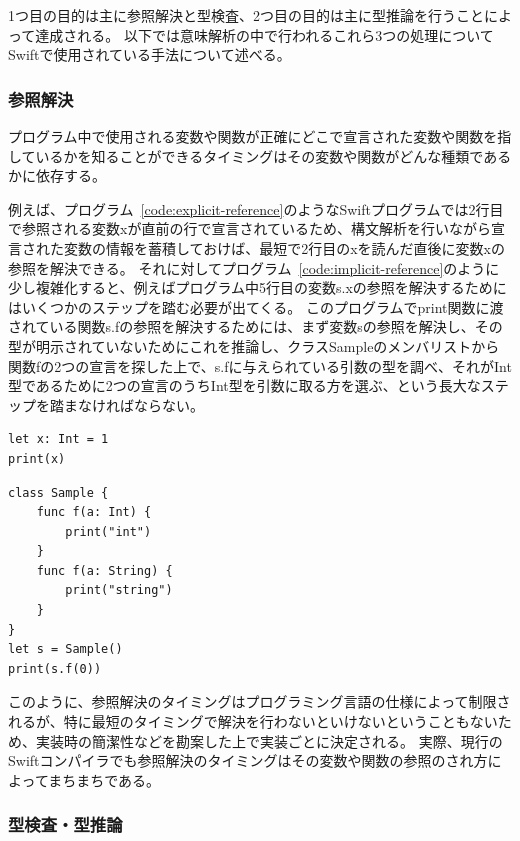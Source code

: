 1つ目の目的は主に参照解決と型検査、2つ目の目的は主に型推論を行うことによって達成される。
以下では意味解析の中で行われるこれら3つの処理についてSwiftで使用されている手法について述べる。

\subsubsection{参照解決}

プログラム中で使用される変数や関数が正確にどこで宣言された変数や関数を指しているかを知ることができるタイミングはその変数や関数がどんな種類であるかに依存する。

例えば、プログラム~\ref{code:explicit-reference}のようなSwiftプログラムでは2行目で参照される変数xが直前の行で宣言されているため、構文解析を行いながら宣言された変数の情報を蓄積しておけば、最短で2行目のxを読んだ直後に変数xの参照を解決できる。
それに対してプログラム~\ref{code:implicit-reference}のように少し複雑化すると、例えばプログラム中5行目の変数s.xの参照を解決するためにはいくつかのステップを踏む必要が出てくる。
このプログラムでprint関数に渡されている関数s.fの参照を解決するためには、まず変数sの参照を解決し、その型が明示されていないためにこれを推論し、クラスSampleのメンバリストから関数fの2つの宣言を探した上で、s.fに与えられている引数の型を調べ、それがInt型であるために2つの宣言のうちInt型を引数に取る方を選ぶ、という長大なステップを踏まなければならない。

\begin{lstlisting}[caption=直ちに変数解決が可能である例, label=code:explicit-reference]
let x: Int = 1
print(x)
\end{lstlisting}

\begin{lstlisting}[caption=変数解決までに複数の処理が必要となる例, label=code:implicit-reference]
class Sample {
    func f(a: Int) {
        print("int")
    }
    func f(a: String) {
        print("string")
    }
}
let s = Sample()
print(s.f(0))
\end{lstlisting}

このように、参照解決のタイミングはプログラミング言語の仕様によって制限されるが、特に最短のタイミングで解決を行わないといけないということもないため、実装時の簡潔性などを勘案した上で実装ごとに決定される。
実際、現行のSwiftコンパイラでも参照解決のタイミングはその変数や関数の参照のされ方によってまちまちである。

\subsubsection{型検査・型推論}


